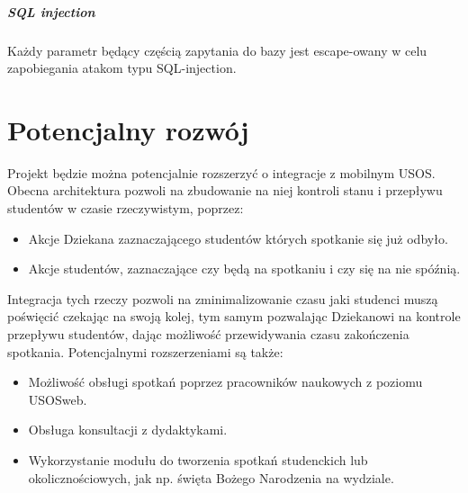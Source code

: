 \documentclass[licencjacka]{pracamgr}
\begin{document}
\paragraph{SQL injection}
Każdy parametr będący częścią zapytania do bazy jest escape-owany w celu zapobiegania atakom typu SQL-injection.




\chapter{Potencjalny rozwój}  \label{chap:rozwoj}

Projekt będzie można potencjalnie rozszerzyć o integracje z mobilnym USOS. Obecna architektura pozwoli na zbudowanie na niej kontroli stanu i przepływu studentów w czasie rzeczywistym, poprzez:
\begin{itemize}
	\item Akcje Dziekana zaznaczającego studentów których spotkanie się już odbyło.
	\item Akcje studentów, zaznaczające czy będą na spotkaniu i czy się na nie spóźnią.
\end{itemize}
Integracja tych rzeczy pozwoli na zminimalizowanie czasu jaki studenci muszą poświęcić czekając na swoją kolej, tym samym pozwalając Dziekanowi na kontrole przepływu studentów, dając możliwość przewidywania czasu zakończenia spotkania. Potencjalnymi rozszerzeniami są także:
\begin{itemize}
	\item Możliwość obsługi spotkań poprzez pracowników naukowych z poziomu USOSweb.
	\item Obsługa konsultacji z dydaktykami.
	\item Wykorzystanie modułu do tworzenia spotkań studenckich lub okolicznościowych, jak np. święta Bożego Narodzenia na wydziale.
\end{itemize}
\end{document}
